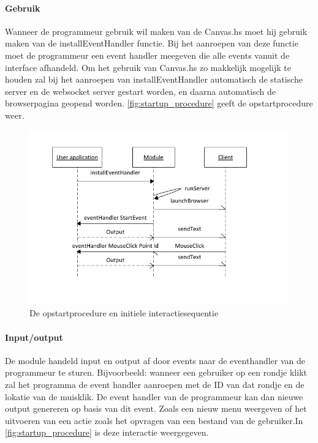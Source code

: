 \paragraph{Gebruik} Wanneer de programmeur gebruik wil maken van de Canvas.hs moet hij gebruik maken van de installEventHandler functie. Bij het aanroepen van deze functie moet de programmeur een event handler meegeven die alle events vanuit de interface afhandeld. Om het gebruik van Canvas.hs zo makkelijk mogelijk te houden zal bij het aanroepen van installEventHandler automatisch de statische server en de websocket server gestart worden, en daarna automatisch de browserpagina geopend worden. \autoref{fig:startup_procedure} geeft de opstartprocedure weer.

\begin{figure}
\begin{center}
\includegraphics[keepaspectratio,width=\textwidth]{./images/module_startup_procedure_interaction.pdf}
\caption{De opstartprocedure en initiele interactiesequentie}
\label{fig:startup_procedure}
\end{center}
\end{figure}

\paragraph{Input/output}
De module handeld input en output af door events naar de eventhandler van de programmeur te sturen. Bijvoorbeeld: wanneer een gebruiker op een rondje klikt zal het programma de event handler aanroepen met de ID van dat rondje en de lokatie van de muisklik. De event handler van de programmeur kan dan nieuwe output genereren op basis van dit event. Zoals een nieuw menu weergeven of het uitvoeren van een actie zoals het opvragen van een bestand van de gebruiker.In \autoref{fig:startup_procedure} is deze interactie weergegeven.

